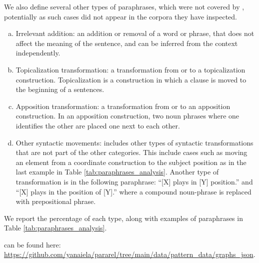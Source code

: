 We also define several other types of paraphrases, which were not covered by \citet{what_is_paraphrase}, potentially as such cases did not appear in the corpora they have inspected.

\begin{enumerate}[a.]
\item Irrelevant addition: an addition or removal of a word or phrase, that does not affect the meaning of the sentence, and can be inferred from the context independently.
\item Topicalization transformation: a transformation from or to a topicalization construction. Topicalization is a construction in which a clause is moved to the beginning of a sentences.
\item Apposition transformation: a transformation from or to an apposition construction. In an apposition construction, two noun phrases where one identifies the other are placed one next to each other.
\item Other syntactic movements: includes other types of syntactic transformations that are not part of the other categories. This include cases such as moving an element from a coordinate construction to the subject position as in the last example in Table \ref{tab:paraphrases_analysis}. Another type of transformation is in the following paraphrase: ``[X] plays in [Y] position.'' and ``[X] plays in the position of [Y].'' where a compound noun-phrase is replaced with prepositional phrase.
\end{enumerate}


We report the percentage of each type, along with examples of paraphrases in Table \ref{tab:paraphrases_analysis}.

\resource{} can be found here: \url{https://github.com/yanaiela/pararel/tree/main/data/pattern_data/graphs_json}.